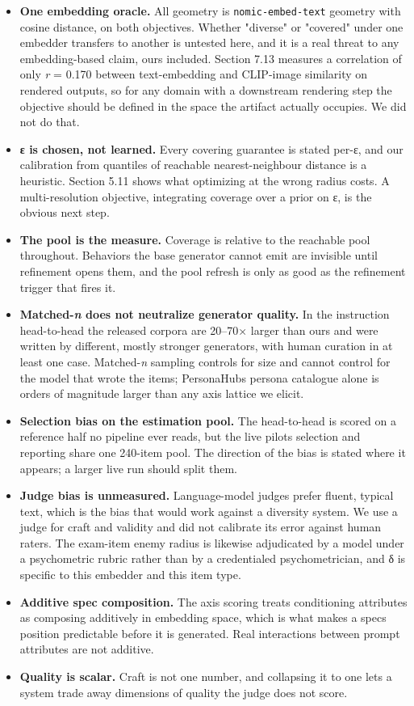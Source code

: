 \documentclass[
  10pt,
]{article}
\providecommand{\tightlist}{%
  \setlength{\itemsep}{0pt}\setlength{\parskip}{0pt}}
\theoremstyle{plain}
\theoremstyle{definition}
\providecommand{\tightlist}{\setlength{\itemsep}{0pt}\setlength{\parskip}{0pt}}
\begin{document}
\begin{itemize}
\tightlist
\item
  \textbf{One embedding oracle.} All geometry is
  \texttt{nomic-embed-text} geometry with cosine distance, on both
  objectives. Whether "diverse" or "covered" under one embedder
  transfers to another is untested here, and it is a real threat to any
  embedding-based claim, ours included. Section 7.13 measures a
  correlation of only \emph{r} = 0.170 between text-embedding and
  CLIP-image similarity on rendered outputs, so for any domain with a
  downstream rendering step the objective should be defined in the space
  the artifact actually occupies. We did not do that.
\item
  \textbf{ε is chosen, not learned.} Every covering guarantee is stated
  per-ε, and our calibration from quantiles of reachable
  nearest-neighbour distance is a heuristic. Section 5.11 shows what
  optimizing at the wrong radius costs. A multi-resolution objective,
  integrating coverage over a prior on ε, is the obvious next step.
\item
  \textbf{The pool is the measure.} Coverage is relative to the
  reachable pool throughout. Behaviors the base generator cannot emit
  are invisible until refinement opens them, and the pool refresh is
  only as good as the refinement trigger that fires it.
\item
  \textbf{Matched-\emph{n} does not neutralize generator quality.} In
  the instruction head-to-head the released corpora are 20--70× larger
  than ours and were written by different, mostly stronger generators,
  with human curation in at least one case. Matched-\emph{n} sampling
  controls for size and cannot control for the model that wrote the
  items; PersonaHub\textquotesingle s persona catalogue alone is orders
  of magnitude larger than any axis lattice we elicit.
\item
  \textbf{Selection bias on the estimation pool.} The head-to-head is
  scored on a reference half no pipeline ever reads, but the live
  pilot\textquotesingle s selection and reporting share one 240-item
  pool. The direction of the bias is stated where it appears; a larger
  live run should split them.
\item
  \textbf{Judge bias is unmeasured.} Language-model judges prefer
  fluent, typical text, which is the bias that would work against a
  diversity system. We use a judge for craft and validity and did not
  calibrate its error against human raters. The exam-item enemy radius
  is likewise adjudicated by a model under a psychometric rubric rather
  than by a credentialed psychometrician, and δ is specific to this
  embedder and this item type.
\item
  \textbf{Additive spec composition.} The axis scoring treats
  conditioning attributes as composing additively in embedding space,
  which is what makes a spec\textquotesingle s position predictable
  before it is generated. Real interactions between prompt attributes
  are not additive.
\item
  \textbf{Quality is scalar.} Craft is not one number, and collapsing it
  to one lets a system trade away dimensions of quality the judge does
  not score.
\end{itemize}
\end{document}
